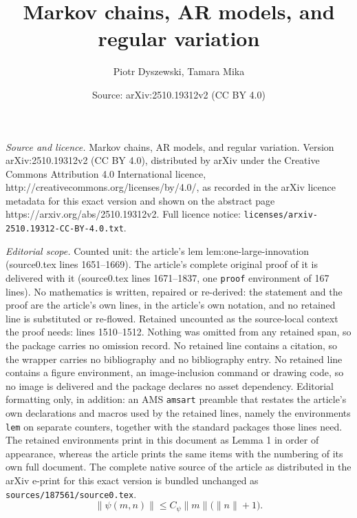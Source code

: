 \documentclass[10pt,a4paper]{amsart}
\title{Markov chains, AR models, and regular variation}
\author{Piotr Dyszewski, Tamara Mika}
\date{Source: arXiv:2510.19312v2 (CC BY 4.0)}
\newcommand{\mbf}{{ m}}
\newcommand{\nbf}{{ n}}
\begin{document}
\maketitle

\noindent\emph{Source and licence.} Markov chains, AR models, and regular variation. Version arXiv:2510.19312v2 (CC BY 4.0), distributed by arXiv under the Creative Commons Attribution 4.0 International licence, http://creativecommons.org/licenses/by/4.0/, as recorded in the arXiv licence metadata for this exact version and shown on the abstract page https://arxiv.org/abs/2510.19312v2. Full licence notice: \texttt{licenses/arxiv-2510.19312-CC-BY-4.0.txt}.\par\smallskip

\noindent\textit{Editorial scope.} Counted unit: the article's lem lem:one-large-innovation (source0.tex lines 1651--1669). The article's complete original proof of it is delivered with it (source0.tex lines 1671--1837, one \texttt{proof} environment of 167 lines). No mathematics is written, repaired or re-derived: the statement and the proof are the article's own lines, in the article's own notation, and no retained line is substituted or re-flowed.  Retained uncounted as the source-local context the proof needs: lines 1510--1512.  Nothing was omitted from any retained span, so the package carries no omission record.  No retained line contains a citation, so the wrapper carries no bibliography and no bibliography entry.  No retained line contains a figure environment, an image-inclusion command or drawing code, so no image is delivered and the package declares no asset dependency.  Editorial formatting only, in addition: an AMS \texttt{amsart} preamble that restates the article's own declarations and macros used by the retained lines, namely the environments \texttt{lem} on separate counters, together with the standard packages those lines need.  The retained environments print in this document as Lemma 1 in order of appearance, whereas the article prints the same items with the numbering of its own full document.  The complete native source of the article as distributed in the arXiv e-print for this exact version is bundled unchanged as \texttt{sources/187561/source0.tex}.
    \begin{equation}\label{sass1}
      \|\psi(\mbf, \nbf)\| \le C_{\psi} \|\mbf\| \bigl( \|\nbf\| + 1 \bigr).
    \end{equation}
\end{document}

